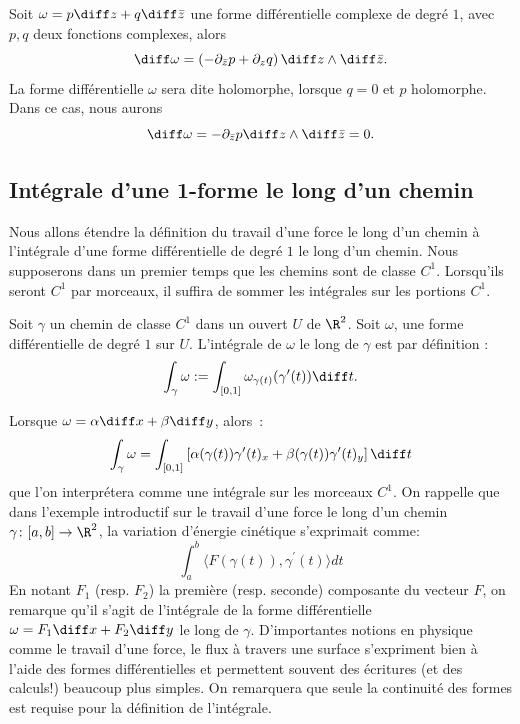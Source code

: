 Soit $\omega=p \diff z + q \diff \bar{z}$ une forme différentielle complexe de degré $1$, avec $p,q$ deux fonctions complexes,  alors
\[\diff \omega = \left(-\partial_{\bar{z}} p + \partial_z q \right) \diff z \wedge \diff \bar{z}.\]
La forme différentielle $\omega$ sera dite holomorphe, lorsque $q=0$ et $p$ holomorphe. Dans ce cas, nous aurons 
\begin{equation}\label{eq:formclosed}
\diff \omega= -\partial_{\bar{z}} p \diff z \wedge \diff \bar{z} =0.
\end{equation}
 
\subsection{Intégrale d'une 1-forme le long d'un chemin}
Nous allons étendre la définition du travail d'une force le long d'un chemin à l'intégrale d'une forme différentielle de degré $1$ le long d'un chemin. Nous supposerons dans un premier temps que les chemins sont de classe $C^1$. Lorsqu'ils seront $C^1$ par morceaux, il suffira de sommer les intégrales sur les portions $C^1$. 
\begin{fdefn}
Soit $\gamma$ un chemin de classe $C^1$ dans un ouvert $U$ de $\R^2$. Soit $\omega$, une forme différentielle de degré $1$ sur $U$. L'intégrale de $\omega$ le long de $\gamma$ est par définition :
\[
\int_{\gamma} \omega := \int_{[0,1]} \omega_{\gamma(t)}(\gamma^\prime (t))\diff t.
\]
\end{fdefn}
Lorsque $\omega= \alpha \diff x + \beta \diff y$, alors~:
\[\int_{\gamma} \omega = \int_{[0,1]} \left [\alpha(\gamma(t))  \gamma^\prime(t)_x +
\beta(\gamma(t))\gamma^\prime(t)_y  \right] \diff t
\]
que l'on interprétera comme une intégrale sur les morceaux $C^1$. 
On rappelle que dans l'exemple introductif sur le travail d'une force le long d'un chemin $\gamma \colon [a,b] \to \R^2$, la variation d'énergie cinétique s'exprimait comme:
\[
\int_a^b \langle F(\gamma(t)), \gamma^\prime(t) \rangle dt
\]
En notant $F_1$ (resp. $F_2$) la première (resp. seconde) composante du vecteur $F$, on remarque qu'il s'agit de l'intégrale de la forme différentielle $\omega = F_1 \diff x + F_2 \diff y$ le long de $\gamma$. D'importantes notions en physique comme le travail d'une force, le flux à travers une surface s'expriment bien à l'aide des formes différentielles et permettent souvent des écritures (et des calculs!) beaucoup plus simples. On remarquera que seule la continuité des formes est requise pour la définition de l'intégrale. 

